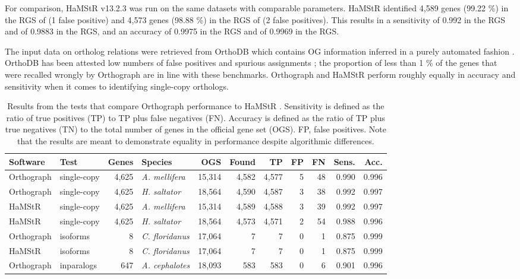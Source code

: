 For comparison, HaMStR v13.2.3 was run on the same datasets with
comparable parameters. HaMStR identified 4,589 genes (99.22 \%) in the
RGS of  (1 false positive) and 4,573 genes (98.88
\%) in the RGS of  (2 false positives). This
results in a sensitivity of 0.992 in the  RGS and
of 0.9883 in the  RGS, and an accuracy of 0.9975 in
the  RGS and of 0.9969 in the  RGS.

The input data on ortholog relations were retrieved from OrthoDB which
contains OG information inferred in a purely automated fashion
\cite{Waterhouse2011}. OrthoDB has been attested low numbers of false
positives and spurious assignments \cite{Trachana2011}; the proportion
of less than 1 \% of the genes that were recalled wrongly by Orthograph
are in line with these benchmarks. Orthograph and HaMStR perform roughly
equally in accuracy and sensitivity when it comes to identifying
single-copy orthologs.


\begin{sidewaystable}[h!]
\caption[Orthograph performance compared to
HaMStR\citep{Ebersberger2009}]{Results from the tests that compare
Orthograph performance to HaMStR \citep{Ebersberger2009}.  Sensitivity
is defined as the ratio of true positives (TP) to TP plus false
negatives (FN). Accuracy is defined as the ratio of TP plus true
negatives (TN) to the total number of genes in the official gene set
(OGS). FP, false positives. Note that the results are meant to
demonstrate equality in performance despite algorithmic
differences.}\label{tab:orthograph-tests}
\begin{tabular}{@{}llrlrrrrrrr@{}}
\toprule
Software   & Test        & Genes  & Species                & OGS       & Found  & TP    & FP & FN & Sens.       & Acc.  \\
\midrule
Orthograph & single-copy & 4,625  & \textit{A. mellifera}  & 15,314    & 4,582  & 4,577 & 5  & 48 & 0.990       & 0.996 \\
Orthograph & single-copy & 4,625  & \textit{H. saltator}   & 18,564    & 4,590  & 4,587 & 3  & 38 & 0.992       & 0.997 \\
HaMStR     & single-copy & 4,625  & \textit{A. mellifera}  & 15,314    & 4,589  & 4,588 & 3  & 39 & 0.992       & 0.997 \\
HaMStR     & single-copy & 4,625  & \textit{H. saltator}   & 18,564    & 4,573  & 4,571 & 2  & 54 & 0.988       & 0.996 \\
Orthograph & isoforms    & 8      & \textit{C. floridanus} & 17,064    & 7      & 7     & 0  & 1  & 0.875       & 0.999 \\
HaMStR     & isoforms    & 8      & \textit{C. floridanus} & 17,064    & 7      & 7     & 0  & 1  & 0.875       & 0.999 \\
Orthograph & inparalogs  & 647    & \textit{A. cephalotes} & 18,093    & 583    & 583   & 0  & 6  & 0.901       & 0.996 \\
\bottomrule
\end{tabular}
\end{sidewaystable}

